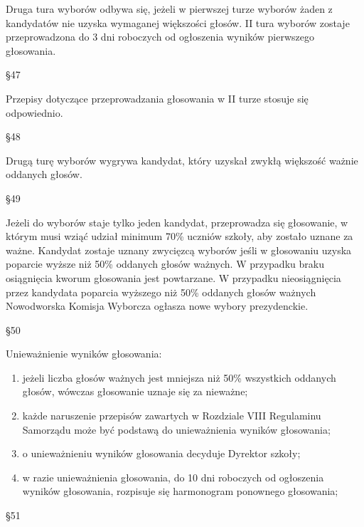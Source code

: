 \documentclass[12pt]{article}
\begin{document}
    Druga tura wyborów odbywa się, jeżeli w pierwszej turze wyborów żaden z kandydatów nie uzyska wymaganej większości głosów. II tura wyborów zostaje przeprowadzona do 3 dni roboczych od ogłoszenia wyników pierwszego głosowania.\\
    \begin{center}
        \S 47\\
    \end{center}
    Przepisy dotyczące przeprowadzania głosowania w II turze stosuje się odpowiednio.\\
    \begin{center}
        \S 48\\
    \end{center}
    Drugą turę wyborów wygrywa kandydat, który uzyskał zwykłą większość ważnie oddanych głosów.\\
    \begin{center}
        \S 49\\
    \end{center}
    Jeżeli do wyborów staje tylko jeden kandydat, przeprowadza się głosowanie, w którym musi wziąć udział minimum 70\% uczniów szkoły, aby zostało uznane za ważne. Kandydat zostaje uznany zwycięzcą wyborów jeśli w głosowaniu uzyska poparcie wyższe niż 50\% oddanych głosów ważnych. W przypadku braku osiągnięcia kworum głosowania jest powtarzane. W przypadku nieosiągnięcia przez kandydata poparcia wyższego niż 50\% oddanych głosów ważnych Nowodworska Komisja Wyborcza ogłasza nowe wybory prezydenckie.\\
    \begin{center}
        \S 50\\
    \end{center}
    Unieważnienie wyników głosowania:
    \begin{enumerate}
        \item jeżeli liczba głosów ważnych jest mniejsza niż 50\% wszystkich oddanych głosów, wówczas głosowanie uznaje się za nieważne;
        \item każde naruszenie przepisów zawartych w Rozdziale VIII Regulaminu Samorządu może być podstawą do unieważnienia wyników głosowania;
        \item o unieważnieniu wyników głosowania decyduje Dyrektor szkoły;
        \item w razie unieważnienia głosowania, do 10 dni roboczych od ogłoszenia wyników głosowania, rozpisuje się harmonogram ponownego głosowania;
    \end{enumerate}
    \begin{center}
        \S 51\\
    \end{center}
\end{document}
